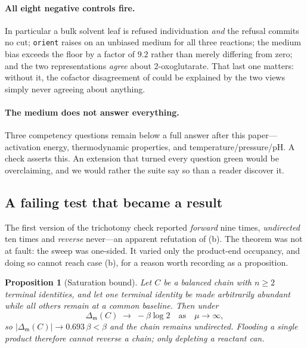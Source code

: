 \documentclass[11pt,twocolumn,a4paper]{article}
\theoremstyle{thmstyle}
\newtheorem{proposition}[theorem]{Proposition}
\theoremstyle{definition}
\theoremstyle{remark}
\newcommand{\flo}{\beta}
\newcommand{\med}{\mathsf{m}}
\newcommand{\shk}[1]{\texttt{#1}}
\newcommand{\abs}[1]{\lvert#1\rvert}
\begin{document}
\paragraph{All eight negative controls fire.} In particular a bulk
solvent leaf is refused individuation \emph{and} the refusal commits no
cut; \shk{orient} raises on an unbiased medium for all three reactions;
the medium bias exceeds the floor by a factor of $9.2$ rather than merely
differing from zero; and the two representations \emph{agree} about
2-oxoglutarate. That last one matters: without it, the cofactor
disagreement of  could be explained by the two views
simply never agreeing about anything.

\paragraph{The medium does not answer everything.} Three competency
questions remain below a full answer after this paper---activation
energy, thermodynamic properties, and temperature/pressure/pH. A check
asserts this. An extension that turned every question green would be
overclaiming, and we would rather the suite say so than a reader discover
it.

\subsection{A failing test that became a result}
\label{sec:log2}

The first version of the trichotomy check reported \emph{forward} nine
times, \emph{undirected} ten times and \emph{reverse} never---an apparent
refutation of (b). The theorem was not at fault: the
sweep was one-sided. It varied only the product-end occupancy, and doing
so cannot reach case (b), for a reason worth recording as a proposition.

\begin{proposition}[Saturation bound]
\label{prop:log2}
Let $C$ be a balanced chain with $n\ge2$ terminal identities, and let one
terminal identity be made arbitrarily abundant while all others remain at
a common baseline. Then under 
\[
\Delta_{\med}(C) \;\longrightarrow\; -\flo\log 2
\quad\text{as}\quad \mu\to\infty,
\]
so $\abs{\Delta_{\med}(C)}\to 0.693\,\flo < \flo$ and the chain remains
\emph{undirected}. Flooding a single product therefore cannot reverse a
chain; only depleting a reactant can.
\end{proposition}
\end{document}
